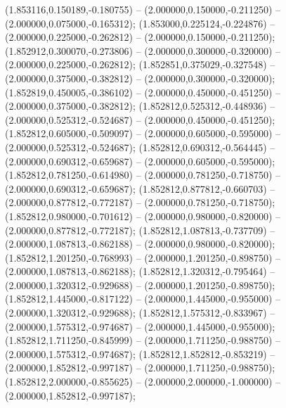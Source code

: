  (1.853116,0.150189,-0.180755) -- (2.000000,0.150000,-0.211250) -- (2.000000,0.075000,-0.165312);
 (1.853000,0.225124,-0.224876) -- (2.000000,0.225000,-0.262812) -- (2.000000,0.150000,-0.211250);
 (1.852912,0.300070,-0.273806) -- (2.000000,0.300000,-0.320000) -- (2.000000,0.225000,-0.262812);
 (1.852851,0.375029,-0.327548) -- (2.000000,0.375000,-0.382812) -- (2.000000,0.300000,-0.320000);
 (1.852819,0.450005,-0.386102) -- (2.000000,0.450000,-0.451250) -- (2.000000,0.375000,-0.382812);
 (1.852812,0.525312,-0.448936) -- (2.000000,0.525312,-0.524687) -- (2.000000,0.450000,-0.451250);
 (1.852812,0.605000,-0.509097) -- (2.000000,0.605000,-0.595000) -- (2.000000,0.525312,-0.524687);
 (1.852812,0.690312,-0.564445) -- (2.000000,0.690312,-0.659687) -- (2.000000,0.605000,-0.595000);
 (1.852812,0.781250,-0.614980) -- (2.000000,0.781250,-0.718750) -- (2.000000,0.690312,-0.659687);
 (1.852812,0.877812,-0.660703) -- (2.000000,0.877812,-0.772187) -- (2.000000,0.781250,-0.718750);
 (1.852812,0.980000,-0.701612) -- (2.000000,0.980000,-0.820000) -- (2.000000,0.877812,-0.772187);
 (1.852812,1.087813,-0.737709) -- (2.000000,1.087813,-0.862188) -- (2.000000,0.980000,-0.820000);
 (1.852812,1.201250,-0.768993) -- (2.000000,1.201250,-0.898750) -- (2.000000,1.087813,-0.862188);
 (1.852812,1.320312,-0.795464) -- (2.000000,1.320312,-0.929688) -- (2.000000,1.201250,-0.898750);
 (1.852812,1.445000,-0.817122) -- (2.000000,1.445000,-0.955000) -- (2.000000,1.320312,-0.929688);
 (1.852812,1.575312,-0.833967) -- (2.000000,1.575312,-0.974687) -- (2.000000,1.445000,-0.955000);
 (1.852812,1.711250,-0.845999) -- (2.000000,1.711250,-0.988750) -- (2.000000,1.575312,-0.974687);
 (1.852812,1.852812,-0.853219) -- (2.000000,1.852812,-0.997187) -- (2.000000,1.711250,-0.988750);
 (1.852812,2.000000,-0.855625) -- (2.000000,2.000000,-1.000000) -- (2.000000,1.852812,-0.997187);
